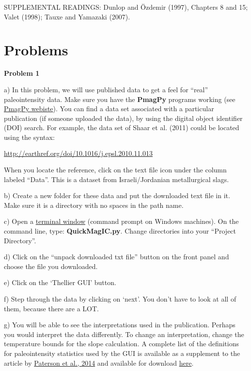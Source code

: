 \noindent SUPPLEMENTAL READINGS: Dunlop and \"Ozdemir (1997), Chapters 8 and 15; \nocite{dunlop97}
Valet (1998); \nocite{valet98}
Tauxe and Yamazaki (2007). \nocite{tauxe07}


\section{Problems}

{{\parindent 0pt  \parskip 12pt

{\bf Problem 1 }

a)  In this problem, we will use published data to get a feel for ``real'' paleointensity data.  Make sure you have the {\bf PmagPy} programs working (see \href{http://earthref.org/PmagPy/cookbook/}{PmagPy webiste}).  You can find a data set associated with a particular publication (if someone uploaded the data), by using the digital object identifier (DOI) search.  For example, the data set of Shaar et al. (2011)  \nocite{shaar11} could be located using the syntax:   

\url{http://earthref.org/doi/10.1016/j.epsl.2010.11.013} 	
	
When you locate the reference, click on the text file icon under the column labeled ``Data''.     This is a dataset   from  Israeli/Jordanian metallurgical slags.   

b) Create a new folder for these data and put the downloaded text file in it.  Make sure it is a directory with no spaces in the path name.

c) Open a \href{http://earthref.org/PmagPy/cookbook/#command_line}{terminal window} (command prompt on Windows machines).    On the command line,  type:  {\bf QuickMagIC.py}. Change directories into your ``Project Directory''. 

d) Click on the  ``unpack downloaded txt file'' button on the front panel and choose the file you downloaded. 

e) Click on the `Thellier GUI' button.  

f) Step through the data by clicking on `next'.  You don't have to look at all of them, because there are a LOT.  

g)  You will be able to see the interpretations used in the publication.  Perhaps you would interpret the data differently.  To change an interpretation, change the  temperature bounds for the slope calculation.  A complete list of the definitions for paleointensity statistics used by the GUI is available as a supplement to the article by \href{#http://dx.doi.org/10.1002/2013GC005135}{Paterson et al., 2014}  \nocite{paterson14} and available for download   \href{http://onlinelibrary.wiley.com/store/10.1002/2013GC005135/asset/supinfo/ggge20412-sup-0001-suppinfoCORRECTED.pdfv=1&s=e1c3ab0a86c942d1039f6d2e15496aa172dc86ec}
{here}.
 
}}
